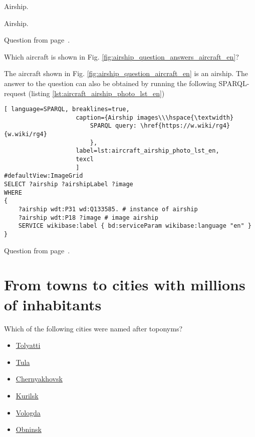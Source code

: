 \begin{marginfigure}[0cm]
    {%
        \setlength{\fboxsep}{0pt}
        \setlength{\fboxrule}{1pt}
    }
	\caption{Airship.}
\end{marginfigure}

Airship. 

Question from page~\pageref{question:aircraft_question_4}.


\begin{exercise}%
\label{answer:aircraft_question_airship_2_en}
Which aircraft is shown in Fig. \ref{fig:airship_question_answers_aircraft_en}?

\end{exercise}

The aircraft shown in Fig. \ref{fig:airship_question_aircraft_en} is an airship. 
The answer to the question can also be obtained by running the following SPARQL-request (listing \ref{lst:aircraft_airship_photo_lst_en})

\begin{lstlisting}[ language=SPARQL, breaklines=true, 
                    caption={Airship images\\\hspace{\textwidth}
                        SPARQL query: \href{https://w.wiki/rg4}{w.wiki/rg4}
                        },
                    label=lst:aircraft_airship_photo_lst_en,
                    texcl 
                    ]
#defaultView:ImageGrid
SELECT ?airship ?airshipLabel ?image
WHERE
{
    ?airship wdt:P31 wd:Q133585. # instance of airship
  	?airship wdt:P18 ?image # image airship
    SERVICE wikibase:label { bd:serviceParam wikibase:language "en" }
}
\end{lstlisting}

Question from page~\pageref{question:aircraft_question_5}.



\section{From towns to cities with millions of inhabitants}

\begin{exercise}%
    \label{answer:cities_geographic_objects}
Which of the following cities were named after toponyms?
\begin{itemize}
\item \href{https://w.wiki/pzi}{Tolyatti}
\item \href{https://w.wiki/pzj}{Tula}
\item \href{https://w.wiki/pzk}{Chernyakhovsk}
\item \href{https://w.wiki/pzm}{Kurilsk}
\item \href{https://w.wiki/pzn}{Vologda}
\item \href{https://w.wiki/pzo}{Obninsk}
\end{itemize}
\end{exercise}

